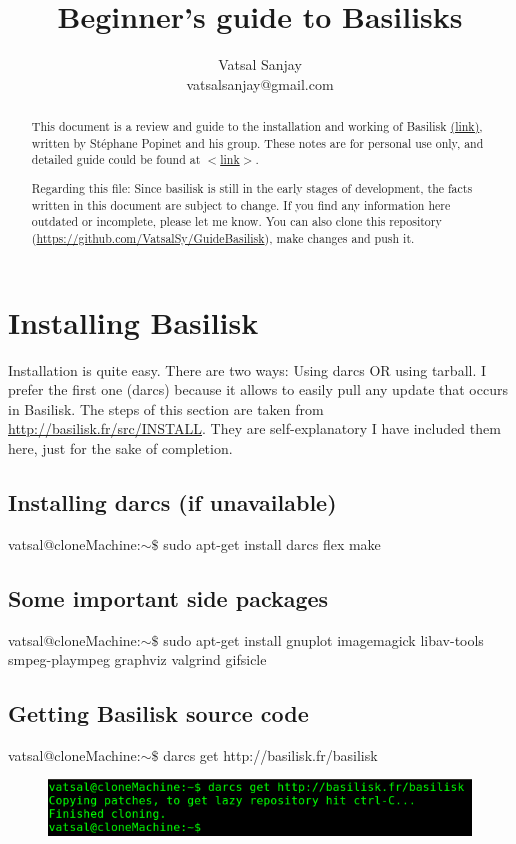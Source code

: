 \documentclass[]{article}
\title{\textbf{Beginner's guide to Basilisks}}
\author{Vatsal Sanjay\\vatsalsanjay@gmail.com}
\newcommand\Colorhref[3][blue]{\href{#2}{\color{#1}#3}}
\begin{document}
\maketitle
\begin{abstract}
This document is a review and guide to the installation and working of Basilisk \Colorhref{http://basilisk.fr/}{(link)}, written by St\'ephane Popinet and his group. These notes are for personal use only, and detailed guide could be found at \Colorhref{http://basilisk.fr/Tutorial}{$<$link$>$}.\\\par 
Regarding this file: Since basilisk is still in the early stages of development, the facts written in this document are subject to change. If you find any information here outdated or incomplete, please let me know. You can also clone this repository (\Colorhref{https://github.com/VatsalSy/GuideBasilisk}{https://github.com/VatsalSy/GuideBasilisk}), make changes and push it.
\end{abstract}
\section{Installing Basilisk}
Installation is quite easy. There are two ways: Using darcs OR using tarball. I prefer the first one (darcs) because it allows to easily pull any update that occurs in Basilisk. The steps of this section are taken from \Colorhref{http://basilisk.fr/src/INSTALL}{http://basilisk.fr/src/INSTALL}. They are self-explanatory I have included them here, just for the sake of completion. 
\subsection{Installing darcs (if unavailable)}
{\color{red}vatsal@cloneMachine:$\sim\$$} sudo apt-get install darcs flex make
\subsection{Some important side packages}
{\color{red}vatsal@cloneMachine:$\sim\$$} sudo apt-get install gnuplot imagemagick libav-tools smpeg-plaympeg graphviz valgrind gifsicle
\subsection{Getting Basilisk source code}
{\color{red}vatsal@cloneMachine:$\sim\$$} darcs get http://basilisk.fr/basilisk
\begin{figure}[h]
\centering
\includegraphics[width=0.75\linewidth]{Figure1}
\end{figure}
\end{document}
